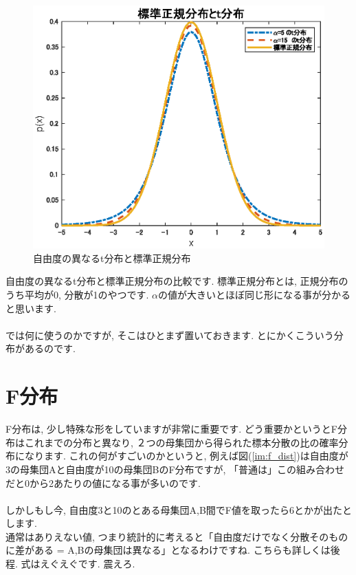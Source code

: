 \documentclass[11pt,a4paper,uplatex]{ujreport} 	%
\begin{document}
\begin{figure}[H]
\label{im:student}
  \centering
  \includegraphics[width=120mm]{../figures/student.eps}
  \caption{自由度の異なるt分布と標準正規分布}
\end{figure}

自由度の異なるt分布と標準正規分布の比較です. 標準正規分布とは, 正規分布のうち平均が0, 分散が1のやつです. $\alpha$の値が大きいとほぼ同じ形になる事が分かると思います.\\
\\

では何に使うのかですが, そこはひとまず置いておきます. とにかくこういう分布があるのです.


\section{F分布}
F分布は, 少し特殊な形をしていますが非常に重要です. どう重要かというとF分布はこれまでの分布と異なり, ２つの母集団から得られた標本分散の比の確率分布になります. これの何がすごいのかというと, 例えば図(\ref{im:f_dist})は自由度が3の母集団Aと自由度が10の母集団BのF分布ですが, 「普通は」この組み合わせだと0から2あたりの値になる事が多いのです. \\
\\

しかしもし今, 自由度3と10のとある母集団A,B間でF値を取ったら6とかが出たとします. \\

通常はありえない値, つまり統計的に考えると「自由度だけでなく分散そのものに差がある = A,Bの母集団は異なる」となるわけですね. こちらも詳しくは後程. 式はえぐえぐです. 震えろ.
\end{document}
